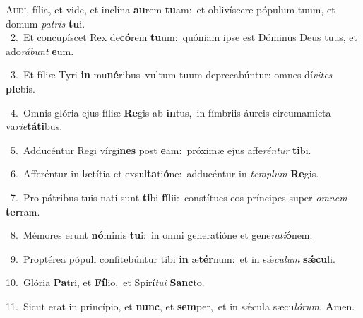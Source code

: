 \lettrine{\initial\textcolor{\initialcolor}{A}}{udi,} fília, et vide, et inclína \textbf{au}\-rem \textbf{tu}\-am:~\star et oblivíscere pópulum tuum, et domum \textit{pa}\-\textit{tris} \textbf{tu}\-i.\\
{\numbfont\textcolor{\numbcolor}{~2.}}~Et concupíscet Rex de\-\textbf{có}\-rem \textbf{tu}\-um:~\star quóniam ipse est Dóminus Deus tuus, et ado\-\textit{rá}\-\textit{bunt} \textbf{e}\-um.\par
{\numbfont\textcolor{\numbcolor}{~3.}}~Et fíliæ Tyri \textbf{in} mu\-\textbf{né}\-ribus~\star vultum tuum deprecabúntur: omnes dí\-\textit{vi}\-\textit{tes} \textbf{ple}\-bis.\par
{\numbfont\textcolor{\numbcolor}{~4.}}~Omnis glória ejus fíliæ \textbf{Re}\-gis ab \textbf{in}\-tus,~\star in fímbriis áureis circumamícta va\-\textit{ri}\-\textit{e}\textbf{tá}\textbf{ti}bus.\par
{\numbfont\textcolor{\numbcolor}{~5.}}~Adducéntur Regi vírgi\textbf{nes} post \textbf{e}\-am:~\star próximæ ejus affe\-\textit{rén}\-\textit{tur} \textbf{ti}\-bi.\par
{\numbfont\textcolor{\numbcolor}{~6.}}~Afferéntur in lætítia et exsul\-\textbf{ta}\-ti\-\textbf{ó}\-ne:~\star adducéntur in \textit{tem}\-\textit{plum} \textbf{Re}\-gis.\par
{\numbfont\textcolor{\numbcolor}{~7.}}~Pro pátribus tuis nati sunt \textbf{ti}\-bi \textbf{fí}\-lii:~\star constítues eos príncipes super \textit{om}\-\textit{nem} \textbf{ter}\-ram.\par
{\numbfont\textcolor{\numbcolor}{~8.}}~Mémores erunt \textbf{nó}\-minis \textbf{tu}\-i:~\star in omni generatióne et gene\-\textit{ra}\-\textit{ti}\textbf{ó}nem.\par
{\numbfont\textcolor{\numbcolor}{~9.}}~Proptérea pópuli confitebúntur tibi \textbf{in} æ\-\textbf{tér}\-num:~\star et in sǽ\-\textit{cu}\-\textit{lum} \textbf{sǽ}\-\textbf{cu}li.\par
{\numbfont\textcolor{\numbcolor}{10.}}~Glória \textbf{Pa}\-tri, et \textbf{Fí}\-lio,~\star et Spirí\-\textit{tu}\-\textit{i} \textbf{Sanc}\-to.\par
{\numbfont\textcolor{\numbcolor}{11.}}~Sicut erat in princípio, et \textbf{nunc}\-, et \textbf{sem}\-per,~\star et in sǽcula sæcu\-\textit{ló}\-\textit{rum}. \textbf{A}\-men.\par
